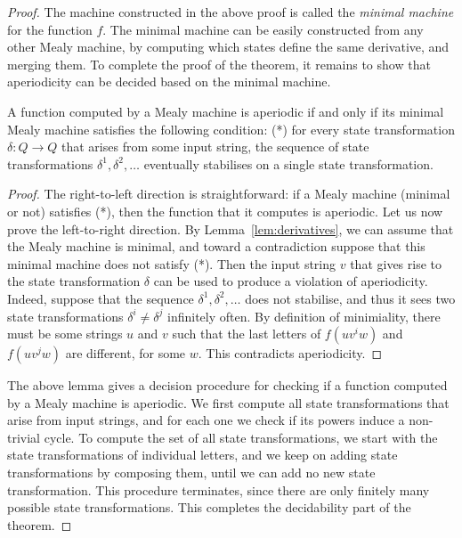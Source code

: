 \begin{proof}
    The machine constructed in the above proof is called the \emph{minimal machine} for the function $f$. The minimal machine can be easily constructed from any other Mealy machine, by computing which states define the same derivative, and merging them. To complete the proof of the theorem, it remains to show that aperiodicity can be decided based on the minimal machine.

    \begin{lemma}\label{lem:aperiodicity-minimal-machine}
        A function computed by a  Mealy machine is aperiodic if and only if its minimal Mealy machine satisfies the following condition: (*) for every state transformation $\delta : Q \to Q$ that arises from some input string, the    sequence of state transformations $\delta^1, \delta^2,\ldots$  eventually stabilises on a single state transformation.
    \end{lemma}
    \begin{proof} The right-to-left direction is straightforward: if a Mealy machine (minimal or not) satisfies (*), then the function that it computes is aperiodic. 
        Let us now prove the left-to-right direction. By Lemma~\ref{lem:derivatives}, we can assume that the Mealy machine is minimal, and toward a contradiction suppose that this minimal machine does not satisfy (*). Then the input string $v$  that gives rise to the state transformation $\delta$ can be used to produce a violation of aperiodicity. Indeed, suppose that the sequence $\delta^1, \delta^2,\ldots$ does not stabilise, and thus it sees two state transformations $\delta^i \neq  \delta^j$ infinitely often. By definition of minimiality, there must be some strings $u$ and $v$ such that the last letters of $f(uv^iw)$ and $f(uv^jw)$ are different, for some $w$. This contradicts aperiodicity.
    \end{proof}

    The above lemma gives a decision procedure for checking if a function computed by a Mealy machine is aperiodic. We first compute all state transformations that arise from input strings, and for each one we check if its powers induce a non-trivial cycle. To compute the set of all state transformations, we start with the state transformations of individual letters, and we keep on adding state transformations by composing them, until we can add no new state transformation. This procedure terminates, since there are only finitely many possible state transformations.   This completes the decidability part of the theorem.


\end{proof}
